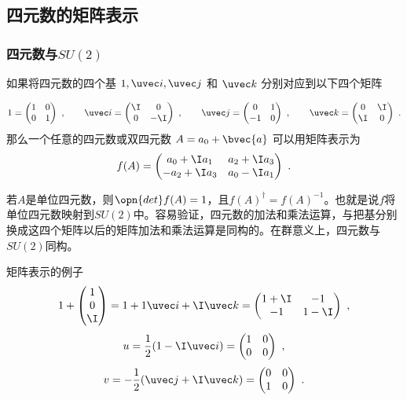 \subsection{四元数的矩阵表示}
\subsubsection{四元数与$SU(2)$}

如果将四元数的四个基 $1, \uvec i, \uvec j$ 和 $\uvec k$ 分别对应到以下四个矩阵

\begin{equation}
1=\begin{pmatrix}1&0\\0&1\end{pmatrix} ~,
\qquad
\uvec i=\begin{pmatrix}\I&0\\0&-\I\end{pmatrix}~,
\qquad
\uvec j=\begin{pmatrix}0&1\\-1&0\end{pmatrix}~,
\qquad
\uvec k=\begin{pmatrix}0&\I\\\I&0\end{pmatrix} ~.
\end{equation}
那么一个任意的四元数或双四元数 $A=a_0+\bvec{a}$ 可以用矩阵表示为
\begin{equation}
f(A)=\begin{pmatrix}a_0+\I a_1&a_2+\I a_3\\-a_2+\I a_3&a_0-\I a_1 \end{pmatrix} ~.
\end{equation}

若$A$是单位四元数，则$\opn{det}f(A)=1$，且$f(A)^{\dagger}=f(A)^{-1}$。也就是说$f$将单位四元数映射到$SU(2)$中。容易验证，四元数的加法和乘法运算，与把基分别换成这四个矩阵以后的矩阵加法和乘法运算是同构的。在群意义上，四元数与$SU(2)$同构。

\begin{example}{矩阵表示的例子}\label{ex_Quat_1}
\begin{equation}
1+\begin{pmatrix}1\\0\\\I\end{pmatrix} =1+1\uvec i+\I\uvec k =\begin{pmatrix}1+\I&-1\\-1&1-\I\end{pmatrix} ~,
\end{equation}
\begin{equation}
u=\frac{1}{2}(1-\I\uvec i)=\begin{pmatrix}1&0\\0&0\end{pmatrix} ~,
\end{equation}
\begin{equation}
v=-\frac{1}{2}(\uvec j+\I\uvec k)=\begin{pmatrix}0&0\\1&0\end{pmatrix} ~.
\end{equation}
\end{example}

